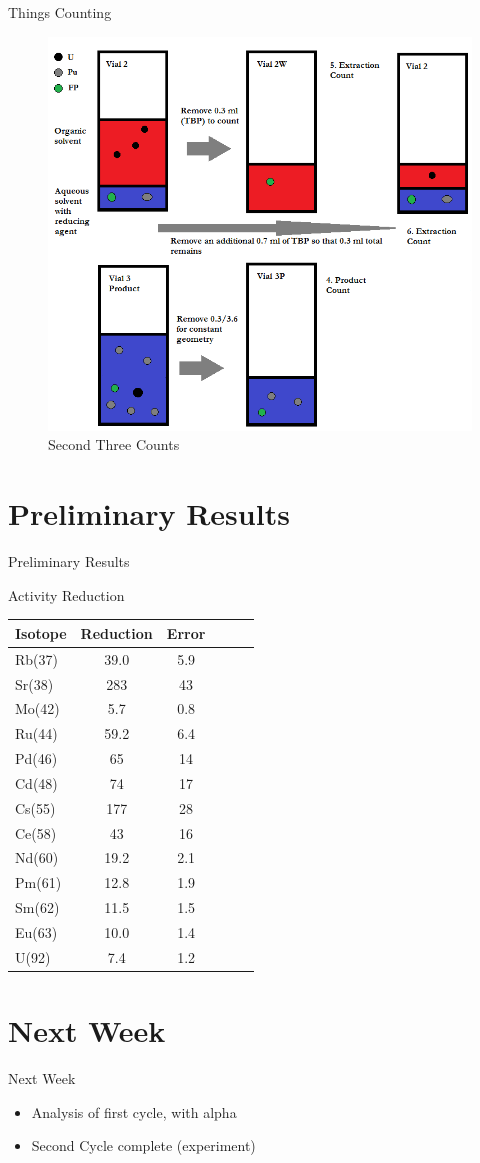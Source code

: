 \documentclass{beamer}
\begin{document}
\begin{frame}{Things Counting}
  \begin{figure}[H] %
    \begin{center}
      \includegraphics[width=0.6\linewidth]
                      {Back_Extraction_Cycle_1_Last_3_Counts}
    \end{center}
    \caption{Second Three Counts}
  \end{figure}
\end{frame}

\section{Preliminary Results}
\begin{frame}{Preliminary Results}
  \vspace{-0.6cm}
  \begin{block}{Activity Reduction}
    \begin{center}
      \vskip -0.2cm
  {\fontsize{7}{11.2}\selectfont
  \begin{tabular}{l  c  c c c c}\toprule
   Isotope & Reduction & Error \\ \midrule 
   Rb(37) & 39.0 & 5.9  \\
   Sr(38) & 283  & 43   \\
   Mo(42) & 5.7  & 0.8  \\
   Ru(44) & 59.2 & 6.4  \\
   Pd(46) & 65   & 14   \\
   Cd(48) & 74   & 17   \\
   Cs(55) & 177  & 28   \\
   Ce(58) & 43   & 16   \\
   Nd(60) & 19.2 & 2.1  \\
   Pm(61) & 12.8 & 1.9  \\
   Sm(62) & 11.5 & 1.5  \\
   Eu(63) & 10.0 & 1.4  \\
   U(92) & 7.4   & 1.2  \\ \bottomrule
  \end{tabular}
  }
  \end{center}
  \end{block}
\end{frame}

\section{Next Week}
\begin{frame}{Next Week}
  \begin{itemize}
  \item{Analysis of first cycle, with alpha}
  \item{Second Cycle complete (experiment)}
  \end{itemize}
\end{frame}
\end{document}
